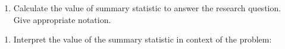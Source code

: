 \documentclass[
]{report}
\providecommand{\tightlist}{%
  \setlength{\itemsep}{0pt}\setlength{\parskip}{0pt}}
\begin{document}
\begin{enumerate}
\def\labelenumi{\alph{enumi}.}
\setcounter{enumi}{3}
\tightlist
\item
  Calculate the value of summary statistic to answer the research question. Give appropriate notation.
\end{enumerate}

\vspace{0.4in}

\begin{enumerate}
\def\labelenumi{\alph{enumi}.}
\setcounter{enumi}{4}
\tightlist
\item
  Interpret the value of the summary statistic in context of the problem:
\end{enumerate}

\vspace{0.4in}
\end{document}
